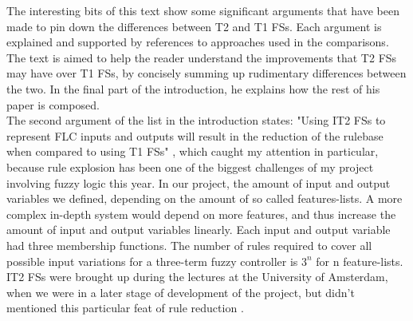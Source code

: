 


The interesting bits of this text show some significant arguments that have
been made to pin down the differences between T2 and T1 FSs. Each argument is
explained and supported by references to approaches used in the comparisons.
The text is aimed to help the reader understand the improvements that T2 FSs may have over T1 FSs, by concisely summing up rudimentary differences between the two. In the final part of the introduction, he explains how the rest of his paper is composed. \\

The second argument of the list in the introduction states: "Using IT2 FSs to represent FLC inputs and outputs will result in the reduction of the rulebase when compared to using T1 FSs" \cite{differences_between_it2_and_it1}, which caught my attention in particular, because rule explosion has been one of the biggest challenges of my project involving fuzzy logic this year.
In our project, the amount of input and output variables we defined, depending on the amount of so called features-lists. A more complex in-depth system would depend on more features, and thus increase the amount of input and output variables linearly. Each input and output variable had three membership functions. The number of rules required to cover all possible input variations for a three-term fuzzy controller is $3^n$ for n feature-lists. \\

IT2 FSs were brought up during the lectures at the University of Amsterdam, when we were in a later stage of development of the project, but didn't mentioned this particular feat of rule reduction \cite{lecture_6_types_of_fl_and_t2_fs}. \\

